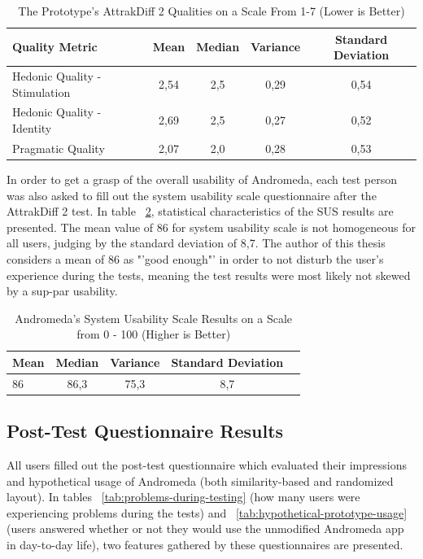 \begin{table}[H]
\begin{center}
\begin{tabular}{ | l | c | c | c | c |}
	\hline
	\textbf{Quality Metric} & \textbf{Mean} & \textbf{Median} & \textbf{Variance} & \textbf{Standard Deviation}\\ \hline
	Hedonic Quality - Stimulation & 2,54 & 2,5 & 0,29 & 0,54 \\ \hline
	Hedonic Quality - Identity & 2,69 & 2,5 & 0,27 & 0,52 \\ \hline
	Pragmatic Quality & 2,07 & 2,0 & 0,28 & 0,53 \\ \hline
\end{tabular}
\caption {The Prototype's AttrakDiff 2 Qualities on a Scale From 1-7 (Lower is Better)} \label{tab:attrakdiff} 
\end{center}
\end{table}

In order to get a grasp of the overall usability of Andromeda, each test person was also asked to fill out the system usability scale questionnaire after the AttrakDiff 2 test. In table ~\ref{tab:sus}, statistical characteristics of the SUS results are presented. The mean value of 86 for system usability scale is not homogeneous for all users, judging by the standard deviation of 8,7. The author of this thesis considers a mean of 86 as "'good enough"' in order to not disturb the user's experience during the tests, meaning the test results were most likely not skewed by a sup-par usability.

\begin{table}[H]
\begin{center}
\begin{tabular}{ | l | c | c | c | c |}
	\hline
	\textbf{Mean} & \textbf{Median} & \textbf{Variance} & \textbf{Standard Deviation}\\ \hline
	86 & 86,3 & 75,3 & 8,7 \\ \hline
\end{tabular}
\caption {Andromeda's System Usability Scale Results on a Scale from 0 - 100 (Higher is Better)} \label{tab:sus} 
\end{center}
\end{table}


\subsection{Post-Test Questionnaire Results}

All users filled out the post-test questionnaire which evaluated their impressions and hypothetical usage of Andromeda (both similarity-based and randomized layout). In tables ~\ref{tab:problems-during-testing} (how many users were experiencing problems during the tests) and ~\ref{tab:hypothetical-prototype-usage} (users answered whether or not they would use the unmodified Andromeda app in day-to-day life), two features gathered by these questionnaires are presented.

